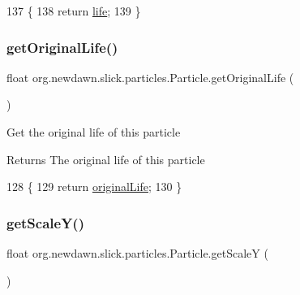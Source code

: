 \begin{DoxyCode}
137                            \{
138         \textcolor{keywordflow}{return} \mbox{\hyperlink{classorg_1_1newdawn_1_1slick_1_1particles_1_1_particle_a361d2a9d01b66d38d90496c096970aab}{life}};
139     \}
\end{DoxyCode}
\mbox{\label{classorg_1_1newdawn_1_1slick_1_1particles_1_1_particle_a87c4fa11b5f1b4c996d102ece9e594af}} 
\subsubsection{\texorpdfstring{get\+Original\+Life()}{getOriginalLife()}}
{\footnotesize\ttfamily float org.\+newdawn.\+slick.\+particles.\+Particle.\+get\+Original\+Life (\begin{DoxyParamCaption}{ }\end{DoxyParamCaption})\hspace{0.3cm}{\ttfamily [inline]}}

Get the original life of this particle

\begin{DoxyReturn}{Returns}
The original life of this particle 
\end{DoxyReturn}

\begin{DoxyCode}
128                                    \{
129         \textcolor{keywordflow}{return} \mbox{\hyperlink{classorg_1_1newdawn_1_1slick_1_1particles_1_1_particle_a7f473d309ac29f2740d498c7d3d58f98}{originalLife}};
130     \}
\end{DoxyCode}
\mbox{\label{classorg_1_1newdawn_1_1slick_1_1particles_1_1_particle_a49022532a526617c26564cd31f02e8b9}} 
\subsubsection{\texorpdfstring{get\+Scale\+Y()}{getScaleY()}}
{\footnotesize\ttfamily float org.\+newdawn.\+slick.\+particles.\+Particle.\+get\+ScaleY (\begin{DoxyParamCaption}{ }\end{DoxyParamCaption})\hspace{0.3cm}{\ttfamily [inline]}}

